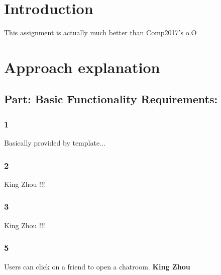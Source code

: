 \documentclass[12pt]{article}
\begin{document}
\section{Introduction}

This assignment is actually much better than Comp2017's o.O

\section{Approach explanation}
    \subsection*{Part: Basic Functionality Requirements:}
        \subsubsection*{1} Basically provided by template...

        \subsubsection*{2} King Zhou !!!

        \subsubsection*{3} King Zhou !!!

        \newpage

        \subsubsection*{5} 

        Users can click on a friend to open a chatroom. \textbf{King Zhou}\\
\end{document}
